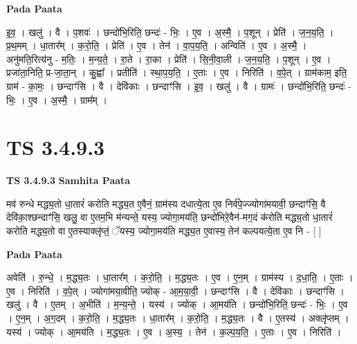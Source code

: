 \documentclass[17pt]{extarticle}
\begin{document}
\textbf{Pada Paata} \newline

इ॒व॒ । खलु॑ । वै । प॒शवः॑ । छन्दो॑भि॒रिति॒ छन्दः॑ - भिः॒ । ए॒व । अ॒स्मै॒ । प॒शून् । प्रेति॑ । ज॒न॒य॒ति॒ । प्र॒थ॒मम् । धा॒तार᳚म् । क॒रो॒ति॒ । प्रेति॑ । ए॒व । तेन॑ । वा॒प॒य॒ति॒ । अन्विति॑ । ए॒व । अ॒स्मै॒ । अनु॑मति॒रित्य॑नु - म॒तिः॒ । म॒न्य॒ते॒ । रा॒ते । रा॒का । प्रेति॑ । सि॒नी॒वा॒ली । ज॒न॒य॒ति॒ । प॒शून् । ए॒व । प्रजा॑ता॒निति॒ प्र-जा॒ता॒न् । कु॒ह्वा᳚ । प्रतीति॑ । स्था॒प॒य॒ति॒ । ए॒ताः । ए॒व । निरिति॑ । व॒पे॒त् । ग्राम॑काम॒ इति॒ ग्राम॑ - का॒मः॒ । छन्दाꣳ॑सि । वै । देवि॑काः । छन्दाꣳ॑सि । इ॒व॒ । खलु॑ । वै । ग्रामः॑ । छन्दो॑भि॒रिति॒ छन्दः॑ - भिः॒ । ए॒व । अ॒स्मै॒ । ग्राम᳚म् ।  \newline




\section*{ TS 3.4.9.3 }

\textbf{TS 3.4.9.3 } \newline
\textbf{Samhita Paata} \newline

मव॑ रुन्धे मद्ध्य॒तो धा॒तारं॑ करोति मद्ध्य॒त ए॒वैनं॒ ग्राम॑स्य दधात्ये॒ता ए॒व निर्व॑पे॒ज्ज्योगा॑मयावी॒ छन्दाꣳ॑सि॒ वै देवि॑का॒श्छन्दाꣳ॑सि॒ खलु॒ वा ए॒तम॒भि म॑न्यन्ते॒ यस्य॒ ज्योगा॒मय॑ति॒ छन्दो॑भिरे॒वैन॑-मग॒दं क॑रोति मद्ध्य॒तो धा॒तारं॑ करोति मद्ध्य॒तो वा ए॒तस्याक्लृ॑प्तं॒ ॅयस्य॒ ज्योगा॒मय॑ति मद्ध्य॒त ए॒वास्य॒ तेन॑ कल्पयत्ये॒ता ए॒व नि - [  ] \newline

\textbf{Pada Paata} \newline

अवेति॑ । रु॒न्धे॒ । म॒द्ध्य॒तः । धा॒तार᳚म् । क॒रो॒ति॒ । म॒द्ध्य॒तः । ए॒व । ए॒न॒म् । ग्राम॑स्य । द॒धा॒ति॒ । ए॒ताः । ए॒व । निरिति॑ । व॒पे॒त् । ज्योगा॑मया॒वीति॒ ज्योक् - आ॒म॒या॒वी॒ । छन्दाꣳ॑सि । वै । देवि॑काः । छन्दाꣳ॑सि । खलु॑ । वै । ए॒तम् । अ॒भीति॑ । म॒न्य॒न्ते॒ । यस्य॑ । ज्योक् । आ॒मय॑ति । छन्दो॑भि॒रिति॒ छन्दः॑ - भिः॒ । ए॒व । ए॒न॒म् । अ॒ग॒दम् । क॒रो॒ति॒ । म॒द्ध्य॒तः । धा॒तार᳚म् । क॒रो॒ति॒ । म॒द्ध्य॒तः । वै । ए॒तस्य॑ । अक्लृ॑प्तम् । यस्य॑ । ज्योक् । आ॒मय॑ति । म॒द्ध्य॒तः । ए॒व । अ॒स्य॒ । तेन॑ । क॒ल्प॒य॒ति॒ । ए॒ताः । ए॒व । निरिति॑ ।  \newline




\end{document}

